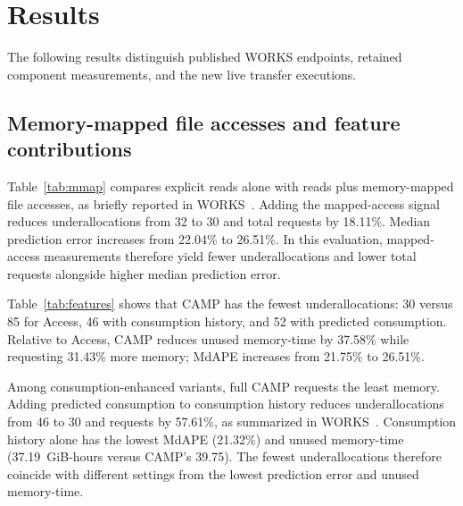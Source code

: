 \section{Results}
\label{sec:results}
The following results distinguish published WORKS endpoints, retained
component measurements, and the new live transfer executions.

\subsection{Memory-mapped file accesses and feature contributions}
Table~\ref{tab:mmap} compares explicit reads alone with reads plus
memory-mapped file accesses, as briefly reported in
WORKS~\cite{camp2026works}. Adding the mapped-access signal reduces
underallocations from 32 to 30 and total requests by 18.11\%.
Median prediction error increases from 22.04\% to 26.51\%. In this
evaluation, mapped-access measurements therefore yield fewer
underallocations and lower total requests alongside higher median
prediction error.

\begin{table}[!t]
\caption{Memory-mapped access ablation on 5,026 tasks.}
\label{tab:mmap}
\centering\small

\end{table}

Table~\ref{tab:features} shows that CAMP has the fewest underallocations:
30 versus 85 for Access, 46 with consumption history, and 52 with
predicted consumption. Relative to Access, CAMP reduces unused memory-time
by 37.58\% while requesting 31.43\% more memory; MdAPE increases from
21.75\% to 26.51\%.

Among consumption-enhanced variants, full CAMP requests the least memory.
Adding predicted consumption to consumption history reduces underallocations
from 46 to 30 and requests by 57.61\%, as summarized in
WORKS~\cite{camp2026works}. Consumption history alone has the lowest MdAPE
(21.32\%) and unused memory-time (37.19~GiB-hours versus CAMP's 39.75).
The fewest underallocations therefore coincide with different settings
from the lowest prediction error and unused memory-time.

\begin{table}[!t]
\caption{Feature ablation on 5,026 tasks.}
\label{tab:features}
\centering\footnotesize
\setlength{\tabcolsep}{3pt}

\end{table}

